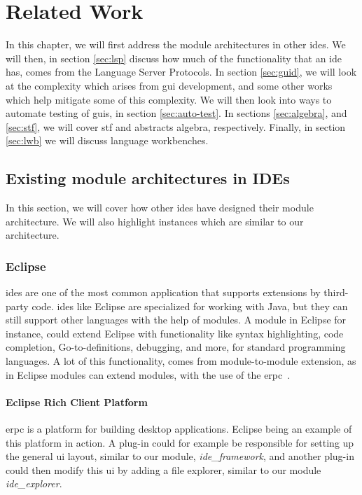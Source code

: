 \chapter{Related Work} \label{cha:related}

In this chapter, we will first address the module architectures in other
\gls*{ide}s. We will then, in section \ref{sec:lsp} discuss how much of the
functionality that an \gls*{ide} has, comes from the Language Server Protocols.
In section \ref{sec:guid}, we will look at the complexity which arises from
\gls*{gui} development, and some other works which help mitigate some of this
complexity. We will then look into ways to automate testing of \gls*{gui}s, in
section \ref{sec:auto-test}. In sections \ref{sec:algebra}, and \ref{sec:stf},
we will cover \gls*{stf} and abstracts algebra, respectively. Finally, in
section \ref{sec:lwb} we will discuss language workbenches.


\section{Existing module architectures in IDEs}

In this section, we will cover how other \gls*{ide}s have designed their
module architecture. We will also highlight instances which are similar to our
architecture.


\subsection{Eclipse}

\gls*{ide}s are one of the most common application that supports extensions by
third-party code. \gls*{ide}s like Eclipse are specialized for working with
Java, but they can still support other languages with the help of modules. A
module in Eclipse for instance, could extend Eclipse with functionality like
syntax highlighting, code completion, Go-to-definitions, debugging, and more,
for standard programming languages. A lot of this functionality, comes from
module-to-module extension, as in Eclipse modules can extend modules, with the
use of the \gls*{erpc}~\cite{eclipseRcp}.


\subsubsection{Eclipse Rich Client Platform}

\gls*{erpc} is a platform for building desktop applications. Eclipse being an
example of this platform in action. A plug-in could for example be responsible
for setting up the general \gls*{ui} layout, similar to our module,
\textit{ide\_framework}, and another plug-in could then modify this \gls*{ui} by
adding a file explorer, similar to our module \textit{ide\_explorer}.


